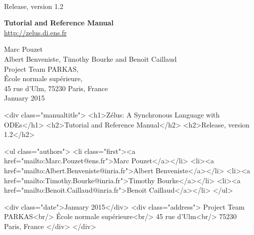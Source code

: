 \documentclass[11pt,titlepage,twoside]{report}
\begin{document}
\pagestyle{empty}

\vfill

\\[2ex]
{\Large Release, version 1.2}


\vspace{7cm}

\begin{center}
{\Huge \bf Tutorial and Reference Manual} \\

\vspace{1cm}
{\Large \url{http://zelus.di.ens.fr}}
\vspace{1.5cm}

{\Large Marc Pouzet} \\[2ex]
{\Large Albert Benveniste, Timothy Bourke and Benoit Caillaud} \\[4ex]
{\large Project Team PARKAS, \\
\'Ecole normale sup\'erieure, \\ 45 rue d'Ulm,
75230 Paris, France} \\[2ex]
{\Large January 2015} \\

\end{center}
\begin{rawhtml}
<div class="manualtitle">
  <h1>Zélus: A Synchronous Language with ODEs</h1>
  <h2>Tutorial and Reference Manual</h2>
  <h2>Release, version 1.2</h2>

  <ul class="authors">
    <li class="first"><a href="mailto:Marc.Pouzet@ens.fr">Marc Pouzet</a></li>
    <li><a href="mailto:Albert.Benveniste@inria.fr">Albert Benveniste</a></li>
    <li><a href="mailto:Timothy.Bourke@inria.fr">Timothy Bourke</a></li>
    <li><a href="mailto:Benoit.Caillaud@inria.fr">Benoit Caillaud</a></li>
  </ul>

  <div class="date">January 2015</div>
  <div class="address">
    Project Team PARKAS<br/>
    École normale supérieure<br/>
    45 rue d'Ulm<br/>
    75230 Paris, France
  </div>
</div>
\end{rawhtml}

\newpage
\cleardoublepage
\tableofcontents
\cleardoublepage
\end{document}
